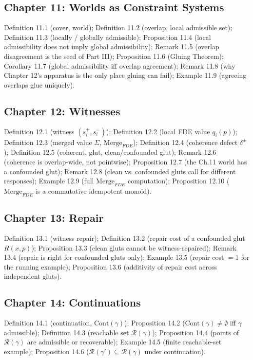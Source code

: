 \documentclass[11pt]{book}
\begin{document}
\subsection*{Chapter 11: Worlds as Constraint Systems}
Definition 11.1 (cover, world); Definition 11.2 (overlap, local admissible set); Definition 11.3 (locally / globally admissible); Proposition 11.4 (local admissibility does not imply global admissibility); Remark 11.5 (overlap disagreement is the seed of Part III); Proposition 11.6 (Gluing Theorem); Corollary 11.7 (global admissibility iff overlap agreement); Remark 11.8 (why Chapter 12's apparatus is the only place gluing can fail); Example 11.9 (agreeing overlaps glue uniquely).

\subsection*{Chapter 12: Witnesses}
Definition 12.1 (witness $(s_i^+,s_i^-)$); Definition 12.2 (local FDE value $q_i(p)$); Definition 12.3 (merged value $\Sigma$, $\mathrm{Merge}_{FDE}$); Definition 12.4 (coherence defect $\delta^\pm$); Definition 12.5 (coherent, glut, clean/confounded glut); Remark 12.6 (coherence is overlap-wide, not pointwise); Proposition 12.7 (the Ch.11 world has a confounded glut); Remark 12.8 (clean vs. confounded gluts call for different responses); Example 12.9 (full $\mathrm{Merge}_{FDE}$ computation); Proposition 12.10 ($\mathrm{Merge}_{FDE}$ is a commutative idempotent monoid).

\subsection*{Chapter 13: Repair}
Definition 13.1 (witness repair); Definition 13.2 (repair cost of a confounded glut $R(x,p)$); Proposition 13.3 (clean gluts cannot be witness-repaired); Remark 13.4 (repair is right for confounded gluts only); Example 13.5 (repair cost $=1$ for the running example); Proposition 13.6 (additivity of repair cost across independent gluts).

\subsection*{Chapter 14: Continuations}
Definition 14.1 (continuation, $\mathrm{Cont}(\gamma)$); Proposition 14.2 ($\mathrm{Cont}(\gamma)\neq\emptyset$ iff $\gamma$ admissible); Definition 14.3 (reachable set $\mathcal R(\gamma)$); Proposition 14.4 (points of $\mathcal R(\gamma)$ are admissible or recoverable); Example 14.5 (finite reachable-set example); Proposition 14.6 ($\mathcal R(\gamma')\subseteq\mathcal R(\gamma)$ under continuation).
\end{document}
